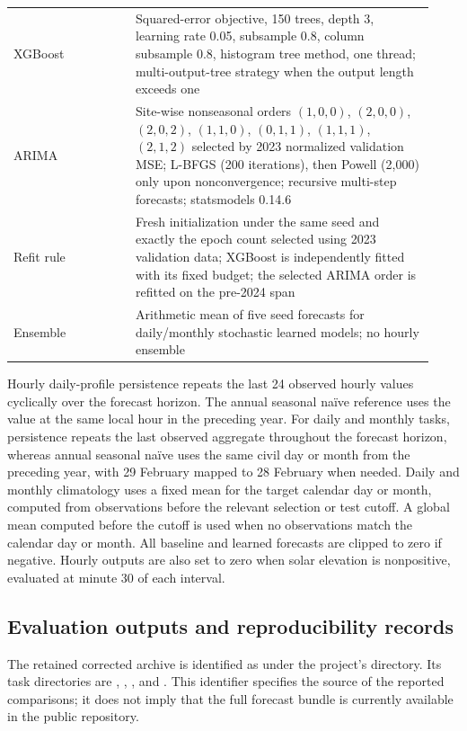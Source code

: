 \begin{table}[!htbp]
\begin{tabular}{@{}
  >{\raggedright\arraybackslash}p{0.27\linewidth}
  >{\raggedright\arraybackslash}p{0.66\linewidth}@{}}
XGBoost & Squared-error objective, 150 trees, depth 3, learning rate 0.05,
subsample 0.8, column subsample 0.8, histogram tree method, one thread;
multi-output-tree strategy when the output length exceeds one \\
ARIMA & Site-wise nonseasonal orders $(1,0,0)$, $(2,0,0)$, $(2,0,2)$,
$(1,1,0)$, $(0,1,1)$, $(1,1,1)$, $(2,1,2)$ selected by 2023 normalized
validation MSE; L-BFGS (200 iterations), then Powell (2,000) only upon
nonconvergence; recursive multi-step forecasts; statsmodels 0.14.6 \\
Refit rule & Fresh initialization under the same seed and exactly the epoch
count selected using 2023 validation data; XGBoost is independently fitted
with its fixed budget; the selected ARIMA order is refitted on the pre-2024
span \\
Ensemble & Arithmetic mean of five seed forecasts for daily/monthly
stochastic learned models; no hourly ensemble \\
\bottomrule
\end{tabular}
\end{table}

Hourly daily-profile persistence repeats the last 24 observed hourly values
cyclically over the forecast horizon. The annual seasonal na\"ive reference
uses the value at the same local hour in the preceding year. For daily and
monthly tasks, persistence repeats the last observed aggregate throughout
the forecast horizon, whereas annual seasonal na\"ive uses the same civil
day or month from the preceding year, with 29 February mapped to 28 February
when needed. Daily and monthly climatology uses a fixed mean for the target
calendar day or month, computed from observations before the relevant
selection or test cutoff. A global mean computed before the cutoff is used
when no observations match the calendar day or month. All baseline and learned
forecasts are clipped to zero if negative. Hourly outputs are also set to zero
when solar elevation is nonpositive, evaluated at minute 30 of each interval.

\subsection{Evaluation outputs and reproducibility records}

The retained corrected archive is identified as
 under the project's
 directory. Its task directories are
, , , and
. This identifier specifies the source of the reported
comparisons; it does not imply that the full forecast bundle is currently
available in the public repository.

